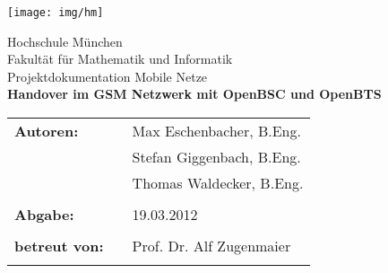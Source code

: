 %
\begin{spacing}{1}
\begin{titlepage}
\begin{flushright}
\texttt{[image: img/hm]}%
\end{flushright}

\vspace*{20mm}
\begin{center}
{\Large Hochschule München}\\
{\large Fakultät für Mathematik und Informatik}\\

\vspace*{15mm}
{\huge Projektdokumentation Mobile Netze}\\

\vspace*{10mm}
{\huge \bfseries{Handover im GSM Netzwerk mit OpenBSC und OpenBTS}} \\
\vspace*{15mm} 
\end{center}

\vspace*{30mm}

\begin{tabular}{lll}
\textbf{\large {Autoren:}} & & \large {Max Eschenbacher, B.Eng.}\\
			   & & \large {Stefan Giggenbach, B.Eng.}\\
			   & & \large {Thomas Waldecker, B.Eng.}\\
& & \\

\textbf{\large {Abgabe:}} & & \large {19.03.2012}\\
& & \\

\textbf{\large {betreut von:}} & & \large {Prof. Dr. Alf Zugenmaier}\\
& & \\
\end{tabular}

\end{titlepage}

\tableofcontents

\end{spacing}
\newpage
